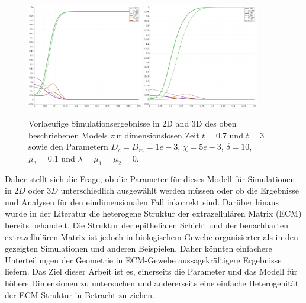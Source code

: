 \begin{figure}[!h]
 \includegraphics[width=0.45\textwidth]{y/anderson_tumor_invasion_model_2Dvs3Dtime0_7_thick.png}
 \includegraphics[width=0.45\textwidth]{y/anderson_tumor_invasion_model_2Dvs3D_time3_thick.png}
 \caption{Vorlaeufige Simulationsergebnisse in 2D and 3D des oben beschriebenen Models 
 zur dimensionslosen Zeit $t=0.7$ und $t=3$ sowie den Parametern $D_c=D_m=1e-3$, 
 $\chi=5e-3$, $\delta=10$, $\mu_3=0.1$ und $\lambda=\mu_1=\mu_2 = 0$.}
 \label{fig:fig1}

\end{figure}
Daher stellt sich die Frage, ob die Parameter für dieses Modell für Simulationen in 
$2D$ oder $3D$ unterschiedlich ausgewählt werden müssen oder ob die Ergebnisse und 
Analysen für den eindimensionalen Fall inkorrekt sind. \newline
Darüber hinaus wurde in der Literatur die heterogene Struktur der extrazellulären 
Matrix (ECM) bereits behandelt. Die Struktur der epithelialen Schicht und der 
benachbarten extrazellulären Matrix ist jedoch in biologischem Gewebe organisierter 
als in den gezeigten Simulationen und anderen Beispielen. Daher könnten einfachere 
Unterteilungen der Geometrie in ECM-Gewebe aussagekräftigere Ergebnisse liefern. \newline
Das Ziel dieser Arbeit ist es, einerseits die Parameter und das Modell für höhere 
Dimensionen zu untersuchen und andererseits eine einfache Heterogenität der ECM-Struktur 
in Betracht zu ziehen.

